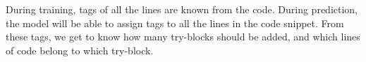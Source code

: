 

During training, tags of all the lines are known from the code. During prediction, the model will be able to assign tags to all the lines in the code snippet. From these tags, we get to know how many try-blocks should be added, and which lines of code belong to which try-block.










